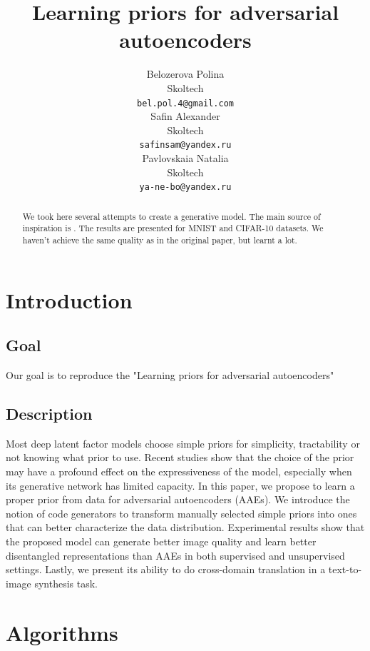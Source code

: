 \documentclass{article}
\title{Learning priors for adversarial autoencoders}
\author{
Belozerova Polina\\
Skoltech\\
\texttt{bel.pol.4@gmail.com} \\
\And
Safin Alexander \\
Skoltech\\
\texttt{safinsam@yandex.ru} \\
\And
Pavlovskaia Natalia \\
Skoltech\\
\texttt{ya-ne-bo@yandex.ru} \\
}
\begin{document}
    \maketitle

    \begin{abstract}
        We took here several attempts to create a generative model. The main source of inspiration is \cite{original}.
        The results are presented for MNIST and CIFAR-10 datasets.
        We haven't achieve the same quality as in the original paper, but learnt a lot.
    \end{abstract}




    \section{Introduction}

    \subsection{Goal}
    Our goal is to reproduce the "Learning priors for adversarial autoencoders" \cite{original}


    \subsection{Description}

    Most deep latent factor models choose simple priors for simplicity, tractability or
    not knowing what prior to use. Recent studies show that the choice of the prior
    may have a profound effect on the expressiveness of the model, especially when
    its generative network has limited capacity. In this paper, we propose to learn a
    proper prior from data for adversarial autoencoders (AAEs). We introduce the
    notion of code generators to transform manually selected simple priors into ones
    that can better characterize the data distribution. Experimental results show that
    the proposed model can generate better image quality and learn better disentangled
    representations than AAEs in both supervised and unsupervised settings. Lastly,
    we present its ability to do cross-domain translation in a text-to-image synthesis
    task.



    \section{Algorithms}
\end{document}
